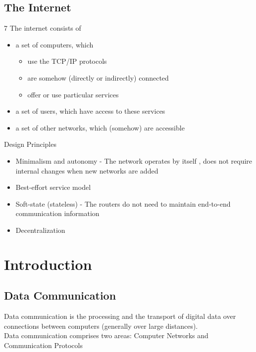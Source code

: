 \documentclass[11pt,ngerman]{article}
\begin{document}
\subsection{The Internet}7
The internet consists of
\begin{itemize}[noitemsep]
	\item a	set	of	computers,	which
	\begin{itemize}[noitemsep]
		\item use	the	TCP/IP	protocols
		\item are	somehow	(directly	or	indirectly)	connected
		\item offer	or	use	particular	services
	\end{itemize}
	\item a	set	of	users,	which	have	access	to	these	services
	\item a	set	of	other	networks,	which	(somehow)	are	accessible
\end{itemize}

Design Principles
\begin{itemize}[noitemsep]
	\item Minimalism	and	autonomy  - The	network	operates	by	itself	, does	not	require	internal	changes	when	new	networks	are	added
	\item Best-effort	service	model
	\item Soft-state	(stateless) - The	routers	do	not need	to	maintain end-to-end	communication	
information
	\item Decentralization
\end{itemize}






\section{Introduction}
\subsection{Data	Communication}
Data	communication	is	the	processing	and	the	transport	of	digital	data	over	
connections	between	computers	(generally	over	large	distances).\\
Data	communication	comprises	two areas: Computer	Networks and Communication	Protocols
\end{document}
